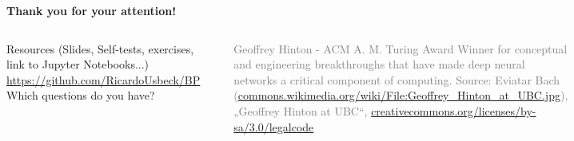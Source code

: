\documentclass[aspectratio=169]{beamer}
\begin{document}
\begin{frame}{\textbf{Thank you for your \textbf{attention}!}}
    \begin{columns}
	 \begin{center}
        \small{\faGraduationCap \hspace{0.15em} {Resources (Slides, Self-tests, exercises, link to Jupyter Notebooks...)\\\small{\faGithub \hspace{0.15em} {\href{https://github.com/RicardoUsbeck/BP}{https://github.com/RicardoUsbeck/BP}}}}} \\
        \smallskip
        \Huge {Which questions do you have?} \\
        
    \end{center}
	\centering
	\includegraphics[width=0.65\linewidth]{Geoffrey_Hinton_at_UBC.jpg}\\
	
	\vspace{3mm}
	
	\tiny \textcolor{gray}{Geoffrey Hinton - ACM A. M. Turing Award Winner for conceptual and engineering breakthroughs that have made deep neural networks a critical component of computing. Source: Eviatar Bach (\url{commons.wikimedia.org/wiki/File:Geoffrey_Hinton_at_UBC.jpg}), „Geoffrey Hinton at UBC“, \url{creativecommons.org/licenses/by-sa/3.0/legalcode}}

\end{columns}
\end{frame}
\end{document}
